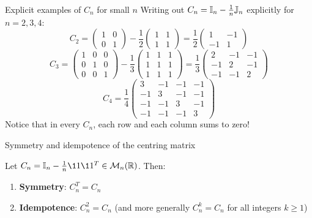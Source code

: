 \documentclass[aspectratio=169]{beamer}\usepackage[]{graphicx}\usepackage[]{xcolor}
\begin{document}
\begin{frame}{Explicit examples of $C_n$ for small $n$}
Writing out $C_n = \mathbb{I}_n - \frac{1}{n}\mathbb{J}_n$ explicitly for $n = 2, 3, 4$:
\vfill
\[
C_2 = \begin{pmatrix} 1 & 0 \\ 0 & 1 \end{pmatrix} - \frac{1}{2}\begin{pmatrix} 1 & 1 \\ 1 & 1 \end{pmatrix}
= \frac{1}{2}\begin{pmatrix} 1 & -1 \\ -1 & 1 \end{pmatrix}
\]
\vfill
\[
C_3 = \begin{pmatrix} 1 & 0 & 0 \\ 0 & 1 & 0 \\ 0 & 0 & 1 \end{pmatrix} - \frac{1}{3}\begin{pmatrix} 1 & 1 & 1 \\ 1 & 1 & 1 \\ 1 & 1 & 1 \end{pmatrix}
= \frac{1}{3}\begin{pmatrix}
2 & -1 & -1 \\
-1 & 2 & -1 \\
-1 & -1 & 2
\end{pmatrix}
\]
\vfill
\[
C_4 = \frac{1}{4}\begin{pmatrix}
3 & -1 & -1 & -1 \\
-1 & 3 & -1 & -1 \\
-1 & -1 & 3 & -1 \\
-1 & -1 & -1 & 3
\end{pmatrix}
\]
\vfill
Notice that in every $C_n$, each row and each column sums to zero!
\end{frame}

\begin{frame}{Symmetry and idempotence of the centring matrix}
\begin{importanttheorem}
\label{th:centring_properties}
Let $C_n = \II_n - \frac{1}{n}\11\11^T \in \M_n(\IR)$. Then:
\begin{enumerate}
\item \textbf{Symmetry}: $C_n^T = C_n$
\item \textbf{Idempotence}: $C_n^2 = C_n$ (and more generally $C_n^k = C_n$ for all integers $k\ge 1$)
\end{enumerate}
\end{importanttheorem}
\end{frame}
\end{document}
